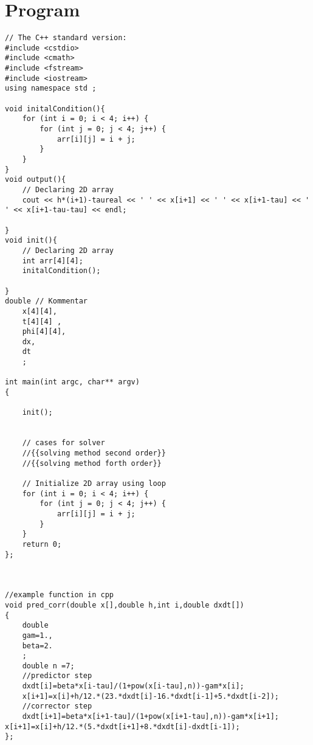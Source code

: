 \documentclass[10pt,fleqn,reqno,a4paper]{article}
\begin{document}
\section{Program}
\begin{verbatim}
// The C++ standard version:
#include <cstdio>
#include <cmath>
#include <fstream>
#include <iostream>
using namespace std ;

void initalCondition(){
    for (int i = 0; i < 4; i++) {
		for (int j = 0; j < 4; j++) {
			arr[i][j] = i + j;
		}
	}
}
void output(){
    // Declaring 2D array
    cout << h*(i+1)-taureal << ' ' << x[i+1] << ' ' << x[i+1-tau] << ' ' << x[i+1-tau-tau] << endl;

}
void init(){
    // Declaring 2D array
	int arr[4][4];
    initalCondition();

}
double // Kommentar
    x[4][4],
    t[4][4] ,
    phi[4][4],
    dx,
    dt
    ;

int main(int argc, char** argv)
{

    init();


    // cases for solver
    //{{solving method second order}}
    //{{solving method forth order}}

	// Initialize 2D array using loop
	for (int i = 0; i < 4; i++) {
		for (int j = 0; j < 4; j++) {
			arr[i][j] = i + j;
		}
	}
	return 0;
};



//example function in cpp
void pred_corr(double x[],double h,int i,double dxdt[])
{
	double
	gam=1.,
	beta=2.
	;
	double n =7;
	//predictor step
	dxdt[i]=beta*x[i-tau]/(1+pow(x[i-tau],n))-gam*x[i];
	x[i+1]=x[i]+h/12.*(23.*dxdt[i]-16.*dxdt[i-1]+5.*dxdt[i-2]);
	//corrector step
	dxdt[i+1]=beta*x[i+1-tau]/(1+pow(x[i+1-tau],n))-gam*x[i+1]; x[i+1]=x[i]+h/12.*(5.*dxdt[i+1]+8.*dxdt[i]-dxdt[i-1]);
};
\end{verbatim}
\end{document}
